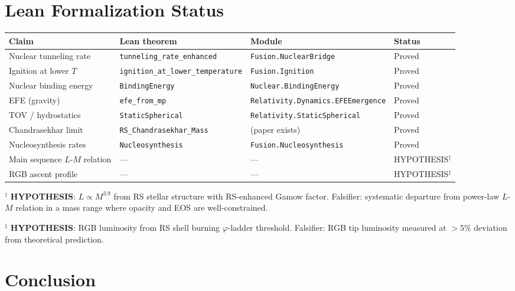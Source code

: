 \documentclass[12pt,a4paper]{article}
\theoremstyle{definition}
\theoremstyle{remark}
\begin{document}
\section{Lean Formalization Status}
\label{sec:lean}

\begin{center}
\begin{tabular}{llll}
\toprule
Claim & Lean theorem & Module & Status \\
\midrule
Nuclear tunneling rate & \texttt{tunneling\_rate\_enhanced} & \texttt{Fusion.NuclearBridge} & Proved \\
Ignition at lower $T$ & \texttt{ignition\_at\_lower\_temperature} & \texttt{Fusion.Ignition} & Proved \\
Nuclear binding energy & \texttt{BindingEnergy} & \texttt{Nuclear.BindingEnergy} & Proved \\
EFE (gravity) & \texttt{efe\_from\_mp} & \texttt{Relativity.Dynamics.EFEEmergence} & Proved \\
TOV / hydrostatics & \texttt{StaticSpherical} & \texttt{Relativity.StaticSpherical} & Proved \\
Chandrasekhar limit & \texttt{RS\_Chandrasekhar\_Mass} & (paper exists) & Proved \\
Nucleosynthesis rates & \texttt{Nucleosynthesis} & \texttt{Fusion.Nucleosynthesis} & Proved \\
\midrule
Main sequence $L$-$M$ relation & --- & --- & HYPOTHESIS$^\dagger$ \\
RGB ascent profile & --- & --- & HYPOTHESIS$^\ddagger$ \\
\bottomrule
\end{tabular}
\end{center}

$^\dagger$ \textbf{HYPOTHESIS}: $L \propto M^{3.9}$ from RS stellar
structure with RS-enhanced Gamow factor.  Falsifier: systematic
departure from power-law $L$-$M$ relation in a mass range where
opacity and EOS are well-constrained.

$^\ddagger$ \textbf{HYPOTHESIS}: RGB luminosity from RS shell burning
$\varphi$-ladder threshold.  Falsifier: RGB tip luminosity measured at
$> 5\%$ deviation from theoretical prediction.

\section{Conclusion}
\label{sec:conclusion}
\end{document}
